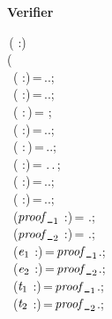 \textbf{Verifier}
\begin{holmath}
    \,( :)\,\HOLSymConst{\HOLTokenEquiv{}}\\
(\\
\,\,\,( :)\,=\,..;\\
\,\,\,( :)\,=\,..;\\
\,\,\,( :\,)\,=\,\,;\\
\,\,\,( :)\,=\,..;\\
\,\,\,( :\,)\,=\,..;\\
\,\,\,( :)\,=\,\,.\,.\,;\\
\,\,\,(\HOLBoundVar{\ensuremath{\alpha}} :)\,=\,..;\\
\,\,\,(\HOLBoundVar{\ensuremath{\beta}} :)\,=\,..;\\
\,\,\,(\ensuremath{\HOLBoundVar{proof\HOLTokenUnderscore{}}\sb{\mathrm{1}}} :)\,=\,\,.;\\
\,\,\,(\ensuremath{\HOLBoundVar{proof\HOLTokenUnderscore{}}\sb{\mathrm{2}}} :)\,=\,\,.;\\
\,\,\,(\ensuremath{\HOLBoundVar{e}\sb{\mathrm{1}}} :)\,=\,\ensuremath{\HOLBoundVar{proof\HOLTokenUnderscore{}}\sb{\mathrm{1}}}.;\\
\,\,\,(\ensuremath{\HOLBoundVar{e}\sb{\mathrm{2}}} :)\,=\,\ensuremath{\HOLBoundVar{proof\HOLTokenUnderscore{}}\sb{\mathrm{2}}}.;\\
\,\,\,(\ensuremath{\HOLBoundVar{t}\sb{\mathrm{1}}} :)\,=\,\ensuremath{\HOLBoundVar{proof\HOLTokenUnderscore{}}\sb{\mathrm{1}}}.;\\
\,\,\,(\ensuremath{\HOLBoundVar{t}\sb{\mathrm{2}}} :)\,=\,\ensuremath{\HOLBoundVar{proof\HOLTokenUnderscore{}}\sb{\mathrm{2}}}.;\\

\end{holmath}

